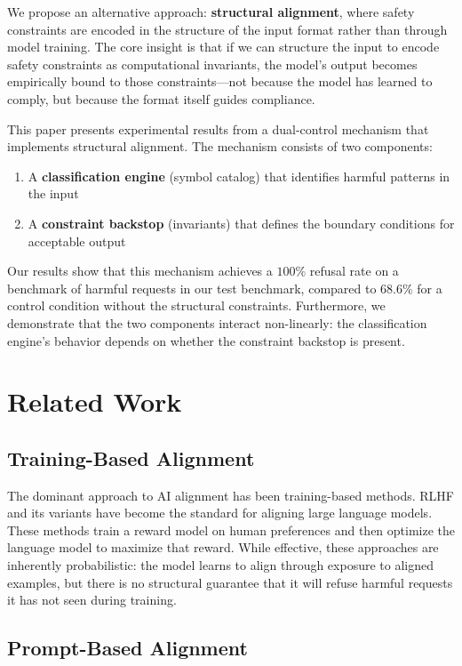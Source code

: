 \documentclass[11pt]{article}
\begin{document}
We propose an alternative approach: \textbf{structural alignment}, where safety constraints are encoded in the structure of the input format rather than through model training. The core insight is that if we can structure the input to encode safety constraints as computational invariants, the model's output becomes empirically bound to those constraints---not because the model has learned to comply, but because the format itself guides compliance.

This paper presents experimental results from a dual-control mechanism that implements structural alignment. The mechanism consists of two components:
\begin{enumerate}[noitemsep,topsep=0pt]
    \item A \textbf{classification engine} (symbol catalog) that identifies harmful patterns in the input
    \item A \textbf{constraint backstop} (invariants) that defines the boundary conditions for acceptable output
\end{enumerate}

Our results show that this mechanism achieves a $100\%$ refusal rate on a benchmark of harmful requests in our test benchmark, compared to $68.6\%$ for a control condition without the structural constraints. Furthermore, we demonstrate that the two components interact non-linearly: the classification engine's behavior depends on whether the constraint backstop is present.

\section{Related Work}

\subsection{Training-Based Alignment}

The dominant approach to AI alignment has been training-based methods. RLHF and its variants \cite{christiano2017, bai2024} have become the standard for aligning large language models. These methods train a reward model on human preferences and then optimize the language model to maximize that reward. While effective, these approaches are inherently probabilistic: the model learns to align through exposure to aligned examples, but there is no structural guarantee that it will refuse harmful requests it has not seen during training.

\subsection{Prompt-Based Alignment}
\end{document}
